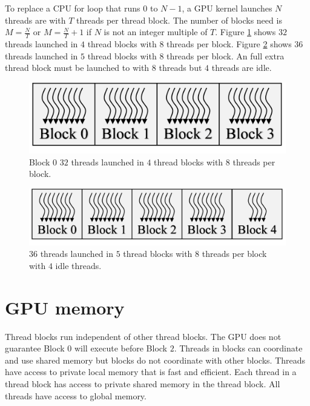 To replace a CPU for loop that runs $0$ to $N-1$, a GPU kernel launches $N$ threads are with $T$ threads per thread block.
The number of blocks need is $M = \frac{N}{T}$ or $M = \frac{N}{T}+1$ if $N$ is not an integer multiple of $T$.
Figure \ref{fig:threadsBlocks32} shows $32$ threads launched in $4$ thread blocks with $8$ threads per block.
Figure \ref{fig:threadsBlocks36} shows $36$ threads launched in $5$ thread blocks with $8$ threads per block. An full extra thread block must be launched to with $8$ threads but $4$ threads are idle.
\begin{figure}
	\centering\includegraphics[width=4in/100*55]{figures/gpu_intro/threadsBlocks32.pdf}
	\caption{Block $0$ $32$ threads launched in $4$ thread blocks with $8$ threads per block.}
	\label{fig:threadsBlocks32}
\end{figure}
\begin{figure}
	\centering\includegraphics[width=5in/100*55]{figures/gpu_intro/threadsBlocks36.pdf}
	\caption{$36$ threads launched in $5$ thread blocks with $8$ threads per block with $4$ idle threads.}
	\label{fig:threadsBlocks36}
\end{figure}

\section{GPU memory}
\label{sec:GPU_memory}
Thread blocks run independent of other thread blocks.
The GPU does not guarantee Block $0$ will execute before Block $2$.
Threads in blocks can coordinate and use shared memory but blocks do not coordinate with other blocks.
Threads have access to private local memory that is fast and efficient.
Each thread in a thread block has access to private shared memory in the thread block.
All threads have access to global memory.

